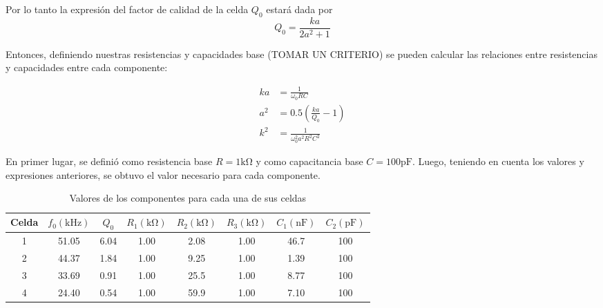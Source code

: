 Por lo tanto la expresión del factor de calidad de la celda $Q_0$ estará dada por
\begin{equation}
    Q_0 = \frac{ka}{2a^2+1}
\end{equation}

Entonces, definiendo nuestras resistencias y capacidades base (TOMAR UN CRITERIO) se pueden calcular las relaciones entre resistencias y capacidades entre cada componente:

\begin{align*}
    ka &= \frac{1}{\omega_0 RC}\\
    a^2&= 0.5\left(\frac{ka}{Q_0}-1\right)\\
    k^2&= \frac{1}{\omega_0^2 a^2 R^2 C^2}
\end{align*}

En primer lugar, se definió como resistencia base $R=1\si{\kilo\ohm}$ y como capacitancia base $C=100\si{\pico\farad}$. Luego, teniendo en cuenta los valores y expresiones anteriores, se obtuvo el valor necesario para cada componente.

\begin{table}[ht]
    \begin{center}
        \begin{tabular}{|c|c|c|c|c|c|c|c|}
            \hline
            Celda   &  $f_0(\si{\kilo\hertz})$   &   $Q_0$   &   $R_1 (\si{\kilo\ohm})$&$R_2(\si{\kilo\ohm})$&$R_3(\si{\kilo\ohm})$&$C_1(\si{\nano\farad})$&$C_2(\si{\pico\farad})$   \\
            \hline
            1   & 51.05 & 6.04  & 1.00  & 2.08  & 1.00  & 46.7  & 100   \\
            2   & 44.37 & 1.84  & 1.00  & 9.25  & 1.00  & 1.39  & 100   \\
            3   & 33.69 & 0.91  & 1.00  & 25.5  & 1.00  & 8.77  & 100   \\
            4   & 24.40 & 0.54  & 1.00  & 59.9  & 1.00  & 7.10  & 100   \\
            \hline
        \end{tabular}
    \end{center}
    \caption{Valores de los componentes para cada una de sus celdas}
\end{table}
